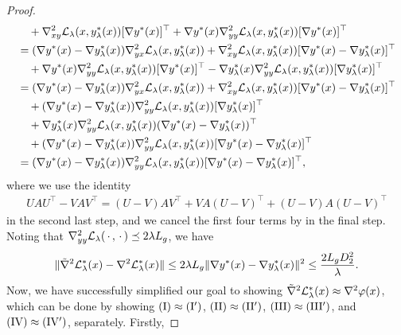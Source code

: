 \begin{proof}
\begin{align*}
    &\quad + \nabla_{xy}^2 {\mathcal{L}}_{\lambda}(x,y_{\lambda}^*(x)) [ \nabla y^*(x)]^\top + \nabla y^*(x) \nabla_{yy}^2 {\mathcal{L}}_{\lambda} (x,y_{\lambda}^*(x)) [\nabla y^*(x)]^\top \\
    &= ( \nabla y^*(x) - \nabla y_{\lambda}^*(x) ) \nabla_{yx}^2 {\mathcal{L}}_{\lambda} (x,y_{\lambda}^*(x)) + \nabla_{xy}^2 {\mathcal{L}}_{\lambda}(x,y_{\lambda}^*(x)) [ \nabla y^*(x) - \nabla y_{\lambda}^*(x)]^\top \\
    &\quad + \nabla y^*(x) \nabla_{yy}^2 {\mathcal{L}}_{\lambda} (x,y_{\lambda}^*(x)) [\nabla y^*(x)]^\top - \nabla y_{\lambda}^*(x) \nabla_{yy}^2 {\mathcal{L}}_{\lambda} (x,y_{\lambda}^*(x)) [\nabla y_{\lambda}^*(x)]^\top \\
    &= ( \nabla y^*(x) - \nabla y_{\lambda}^*(x) ) \nabla_{yx}^2 {\mathcal{L}}_{\lambda} (x,y_{\lambda}^*(x)) + \nabla_{xy}^2 {\mathcal{L}}_{\lambda}(x,y_{\lambda}^*(x)) [ \nabla y^*(x) - \nabla y_{\lambda}^*(x)]^\top \\ 
    &\quad + (\nabla y^*(x) - \nabla y_{\lambda}^*(x)) \nabla_{yy}^2 {\mathcal{L}}_{\lambda} (x,y_{\lambda}^*(x)) [ \nabla y_{\lambda}^*(x)]^\top \\
    &\quad + \nabla y_{\lambda}^*(x) \nabla_{yy}^2 {\mathcal{L}}_{\lambda} (x,y_{\lambda}^*(x)) (\nabla y^*(x) - \nabla y_{\lambda}^*(x))^\top \\
    &\quad + (\nabla y^*(x) - \nabla y_{\lambda}^*(x)) \nabla_{yy}^2 {\mathcal{L}}_{\lambda} (x,y_{\lambda}^*(x)) [ \nabla y^*(x) - \nabla y_{\lambda}^*(x)]^\top \\
    &= (\nabla y^*(x) - \nabla y_{\lambda}^*(x)) \nabla_{yy}^2 {\mathcal{L}}_{\lambda} (x,y_{\lambda}^*(x)) [ \nabla y^*(x) - \nabla y_{\lambda}^*(x)]^\top,
\end{align*}
{where we use the identity
\begin{align*}
    U A U^\top - V A V^\top = (U-V) A V^\top + VA (U-V)^\top + (U-V)A (U-V)^\top
\end{align*}
in the second last step, and we cancel the first four terms by
 in the final step.} Noting that $ \nabla_{yy}^2 {\mathcal{L}}_{\lambda}(\,\cdot\, , \,\cdot\,) \preceq 2 \lambda L_g$, we have
\begin{align*}
    \Vert \tilde \nabla^2 {\mathcal{L}}_{\lambda}^*(x) - \nabla^2 {\mathcal{L}}_{\lambda}^*(x) \Vert \le 2 \lambda L_g \Vert \nabla y^*(x) - \nabla y_{\lambda}^*(x) \Vert^2 \le \frac{2L_g D_2^2}{\lambda }. 
\end{align*}
{Now, we have successfully simplified our goal to showing $\tilde \nabla^2 {\mathcal{L}}_{\lambda}^*(x) \approx \nabla^2 \varphi(x)$, which can be done by showing 
${\rm (I)} \approx {\rm (I')}$, ${\rm (II)} \approx {\rm (II')}$, ${\rm (III)} \approx {\rm (III')}$, and ${\rm (IV)} \approx {\rm (IV')}$, separately. }Firstly,

\end{proof}
